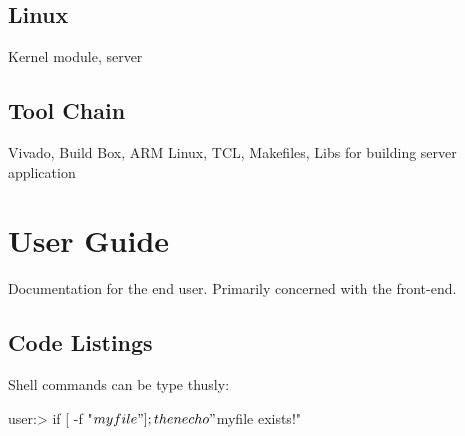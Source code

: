 \documentclass[a4paper,oneside]{alpenthesis/alpenthesis}
\begin{document}

\chapter{Linux} %
\label{ch:Linux}

Kernel module, server


\chapter{Tool Chain} %
\label{ch:Tool_Chain}
Vivado, Build Box, ARM Linux, TCL, Makefiles, Libs for building server application



\part{User Guide} %
\label{part:User_Guide}
Documentation  for the  end user. Primarily  concerned with  the 
front-end.


\cleardoublepage %
\begin{titlingpage*}
    \begin{vplace}
        \flushright\Huge\bfseries\sffamily\appendixpagename
    \end{vplace}
\end{titlingpage*}
\appendix
{}


\chapter{Code Listings}
\label{ch:Code_Listings}

Shell commands can be type thusly:
\begin{commandshell}
    user:> if [ -f "${myfile}" ];then echo "${myfile} exists!"
\end{commandshell}
\end{document}
